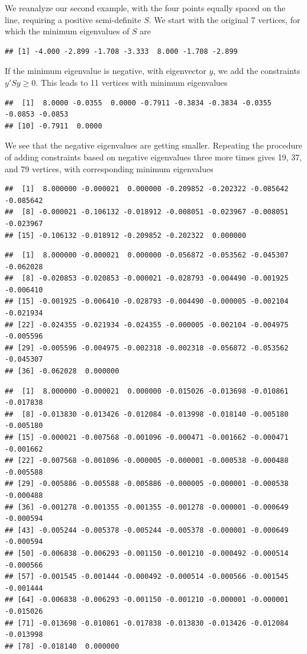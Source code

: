 \documentclass[
  12pt,
]{book}
\theoremstyle{definition}
\theoremstyle{definition}
\theoremstyle{definition}
\theoremstyle{definition}
\theoremstyle{remark}
\begin{document}
We reanalyze our second example, with the four points equally spaced on the line, requiring a positive semi-definite \(S\). We start with the original 7 vertices, for which the minimum eigenvalues of \(S\) are

\begin{verbatim}
## [1] -4.000 -2.899 -1.708 -3.333  8.000 -1.708 -2.899
\end{verbatim}

If the minimum eigenvalue is negative, with eigenvector \(y\), we add the constraints \(y'Sy\geq 0\). This leads to 11 vertices with minimum eigenvalues

\begin{verbatim}
##  [1]  8.0000 -0.0355  0.0000 -0.7911 -0.3834 -0.3834 -0.0355 -0.0853 -0.0853
## [10] -0.7911  0.0000
\end{verbatim}

We see that the negative eigenvalues are getting smaller. Repeating the procedure of adding constraints based on negative eigenvalues three more times gives 19, 37, and 79 vertices, with corresponding minimum eigenvalues

\begin{verbatim}
##  [1]  8.000000 -0.000021  0.000000 -0.209852 -0.202322 -0.085642 -0.085642
##  [8] -0.000021 -0.106132 -0.018912 -0.008051 -0.023967 -0.008051 -0.023967
## [15] -0.106132 -0.018912 -0.209852 -0.202322  0.000000
\end{verbatim}

\begin{verbatim}
##  [1]  8.000000 -0.000021  0.000000 -0.056872 -0.053562 -0.045307 -0.062028
##  [8] -0.020853 -0.020853 -0.000021 -0.028793 -0.004490 -0.001925 -0.006410
## [15] -0.001925 -0.006410 -0.028793 -0.004490 -0.000005 -0.002104 -0.021934
## [22] -0.024355 -0.021934 -0.024355 -0.000005 -0.002104 -0.004975 -0.005596
## [29] -0.005596 -0.004975 -0.002318 -0.002318 -0.056872 -0.053562 -0.045307
## [36] -0.062028  0.000000
\end{verbatim}

\begin{verbatim}
##  [1]  8.000000 -0.000021  0.000000 -0.015026 -0.013698 -0.010861 -0.017838
##  [8] -0.013830 -0.013426 -0.012084 -0.013998 -0.018140 -0.005180 -0.005180
## [15] -0.000021 -0.007568 -0.001096 -0.000471 -0.001662 -0.000471 -0.001662
## [22] -0.007568 -0.001096 -0.000005 -0.000001 -0.000538 -0.000488 -0.005588
## [29] -0.005886 -0.005588 -0.005886 -0.000005 -0.000001 -0.000538 -0.000488
## [36] -0.001278 -0.001355 -0.001355 -0.001278 -0.000001 -0.000649 -0.000594
## [43] -0.005244 -0.005378 -0.005244 -0.005378 -0.000001 -0.000649 -0.000594
## [50] -0.006838 -0.006293 -0.001150 -0.001210 -0.000492 -0.000514 -0.000566
## [57] -0.001545 -0.001444 -0.000492 -0.000514 -0.000566 -0.001545 -0.001444
## [64] -0.006838 -0.006293 -0.001150 -0.001210 -0.000001 -0.000001 -0.015026
## [71] -0.013698 -0.010861 -0.017838 -0.013830 -0.013426 -0.012084 -0.013998
## [78] -0.018140  0.000000
\end{verbatim}
\end{document}
